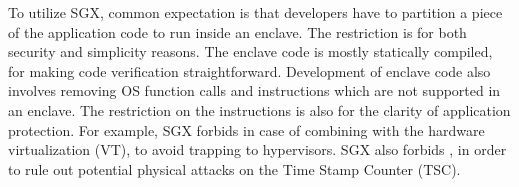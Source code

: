 To utilize SGX, common expectation is that developers have to partition a piece of the application code to run inside an enclave.
The restriction is for both security and simplicity reasons.
The enclave code is mostly statically compiled, for making code verification straightforward.
Development of enclave code also involves removing OS function calls and instructions which are not supported in an enclave.
The restriction on the instructions is also for the clarity of application protection.
For example,
SGX forbids  in case of combining with the hardware virtualization (VT),
to avoid trapping to hypervisors.
SGX also forbids , in order to rule out potential physical attacks on the Time Stamp Counter (TSC). 









